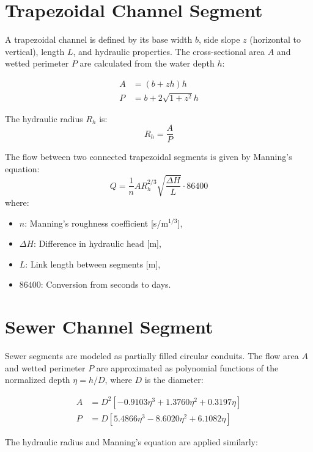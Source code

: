\documentclass[12pt]{report}
\begin{document}
\section{Trapezoidal Channel Segment}

A trapezoidal channel is defined by its base width $b$, side slope $z$ (horizontal to vertical), length $L$, and hydraulic properties. The cross-sectional area $A$ and wetted perimeter $P$ are calculated from the water depth $h$:

\begin{align}
A &= (b + z h) h \\
P &= b + 2 \sqrt{1 + z^2} h
\end{align}

The hydraulic radius $R_h$ is:
\begin{equation}
R_h = \frac{A}{P}
\end{equation}

The flow between two connected trapezoidal segments is given by Manning’s equation:
\begin{equation}
Q = \frac{1}{n} A R_h^{2/3} \sqrt{\frac{\Delta H}{L}} \cdot 86400
\end{equation}
where:
\begin{itemize}
\item $n$: Manning’s roughness coefficient [s/m$^{1/3}$],
\item $\Delta H$: Difference in hydraulic head [m],
\item $L$: Link length between segments [m],
\item $86400$: Conversion from seconds to days.
\end{itemize}

\section{Sewer Channel Segment}

Sewer segments are modeled as partially filled circular conduits. The flow area $A$ and wetted perimeter $P$ are approximated as polynomial functions of the normalized depth $\eta = h/D$, where $D$ is the diameter:

\begin{align}
A &= D^2 \left[ -0.9103 \eta^3 + 1.3760 \eta^2 + 0.3197 \eta \right] \\
P &= D \left[ 5.4866 \eta^3 - 8.6020 \eta^2 + 6.1082 \eta \right]
\end{align}

The hydraulic radius and Manning’s equation are applied similarly:
\end{document}
